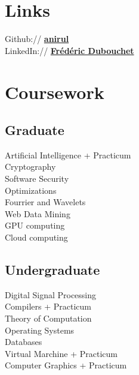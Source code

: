 \documentclass[a4paper]{deedy-resume} %
\begin{document}
\begin{minipage}[t]{0.33\textwidth}
\sectionspace %


\section{Links}

Github:// \href{https://github.com/anirul}{\bf anirul} \\
LinkedIn:// \href{https://www.linkedin.com/in/fr%C3%A9d%C3%A9ric-dubouchet-b885621/}{\bf Frédéric Dubouchet} \\

\sectionspace %


\section{Coursework}

\subsection{Graduate}

Artificial Intelligence + Practicum \\
Cryptography \\
Software Security \\
Optimizations \\
Fourrier and Wavelets \\
Web Data Mining \\
GPU computing \\
Cloud computing

\sectionspace %


\subsection{Undergraduate}

Digital Signal Processing \\
Compilers + Practicum \\
Theory of Computation \\
Operating Systems \\
Databases \\
Virtual Marchine + Practicum \\
Computer Graphics + Practicum

\sectionspace %


\end{minipage} %
\end{document}
